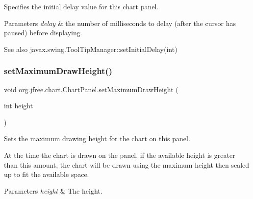 Specifies the initial delay value for this chart panel.


\begin{DoxyParams}{Parameters}
{\em delay} & the number of milliseconds to delay (after the cursor has paused) before displaying.\\
\hline
\end{DoxyParams}
\begin{DoxySeeAlso}{See also}
javax.\+swing.\+Tool\+Tip\+Manager\+::set\+Initial\+Delay(int) 
\end{DoxySeeAlso}
\mbox{\label{classorg_1_1jfree_1_1chart_1_1_chart_panel_a1c479d1166162b36192b573104f4c827}} 
\subsubsection{\texorpdfstring{set\+Maximum\+Draw\+Height()}{setMaximumDrawHeight()}}
{\footnotesize\ttfamily void org.\+jfree.\+chart.\+Chart\+Panel.\+set\+Maximum\+Draw\+Height (\begin{DoxyParamCaption}\item[{int}]{height }\end{DoxyParamCaption})}

Sets the maximum drawing height for the chart on this panel. 

At the time the chart is drawn on the panel, if the available height is greater than this amount, the chart will be drawn using the maximum height then scaled up to fit the available space.


\begin{DoxyParams}{Parameters}
{\em height} & The height. \\
\hline
\end{DoxyParams}
\mbox{\label{classorg_1_1jfree_1_1chart_1_1_chart_panel_a245128d93b552e3f887641b661dfa495}} 
